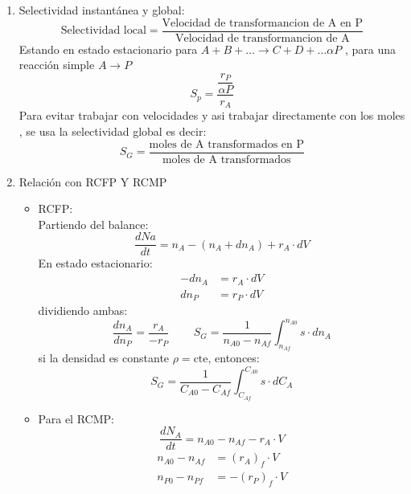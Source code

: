 \begin{enumerate}[label={\alph*)}]
	\item Selectividad instantánea y global:
	      \begin{equation*}
		      \text{Selectividad local} = \frac{\text{Velocidad de transformancion de A en P}}{\text{Velocidad de transformancion de A}}
	      \end{equation*}
	      Estando en estado estacionario para $A +B +\dots\rightarrow C +D +\dots \alpha P$ , para una reacción simple $A \rightarrow P$
	      \begin{equation*}
		      S_p = \frac{\dfrac{r_P}{\alpha P}}{r_A}
	      \end{equation*}
	      Para evitar trabajar con velocidades y asi trabajar directamente con los moles , se usa la selectividad global es decir:
	      \begin{equation*}
		      S_G = \frac{\text{moles de A transformados en P}}{\text{moles de A transformados}}
	      \end{equation*}

	\item Relación con RCFP Y RCMP
	      \begin{itemize}
		      \item RCFP: \\
		            Partiendo del balance:
		            \begin{equation*}
			            \frac{dNa}{dt} = n_A-(n_A+dn_A) + r_A \cdot dV
		            \end{equation*}
		            En estado estacionario:
		            \begin{align*}
			            -dn_A & = r_A \cdot dV \\
			            dn_P  & = r_P \cdot dV
		            \end{align*}
		            dividiendo ambas:
		            \begin{equation*}
			            \frac{dn_A}{dn_P} = \frac{r_A}{-r_P} \quad \, \quad S_G = \frac{1}{n_{A0}-n_{Af}}\int_{n_{Af}}^{n_{A0}} s \cdot dn_A
		            \end{equation*}
		            si la densidad es constante $\rho = \text{cte}$, entonces:
		            \begin{equation*}
			            S_G = \frac{1}{C_{A0}-C_{Af}}\int_{C_{Af}}^{C_{A0}} s \cdot dC_A
		            \end{equation*}

		      \item Para el RCMP:
		            \begin{equation*}
			            \frac{dN_A}{dt} = n_{A0} - n_{Af} - r_A \cdot V
		            \end{equation*}
		            \begin{align*}
			            n_{A0} - n_{Af} & = (r_A)_f \cdot V  \\
			            n_{P0} - n_{Pf} & = -(r_P)_f \cdot V
		            \end{align*}


\end{itemize}
\end{enumerate}
